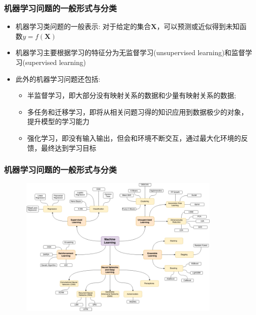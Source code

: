 \frame
{
	\frametitle{机器学习问题的一般形式与分类}
	\begin{itemize}
		\item 机器学习类问题的一般表示:
\vskip 5pt
对于给定的集合$\mathbf{X}$，可以预测或近似得到未知函数$y=f(\mathbf{X})$
\vskip 4pt
{\fontsize{6.2pt}{4.2pt}}
\vskip 5pt
	\textcolor{blue}{\fontsize{8.0pt}{4.2pt}}
\item 机器学习主要根据学习的特征分为无监督学习\textrm{(unsupervised learning)}和监督学习\textrm{(supervised learning)}
	\item 此外的机器学习问题还包括:~
\begin{itemize}
	\item 半监督学习，即大部分没有映射关系的数据和少量有映射关系的数据;
	\item 多任务和迁移学习，即将从相关问题习得的知识应用到数据极少的对象，提升模型的学习能力
	\item 强化学习，即没有输入输出，但会和环境不断交互，通过最大化环境的反馈，最终达到学习目标
\end{itemize}
	\end{itemize}
}

\frame
{
	\frametitle{机器学习问题的一般形式与分类}
\begin{figure}[h!]
\centering
\vspace*{-7pt}
\includegraphics[height=2.7in,width=4.0in,viewport=0 0 875 620,clip]{Figures/ML_class.png}
\label{ML_classification}
\end{figure}
}

